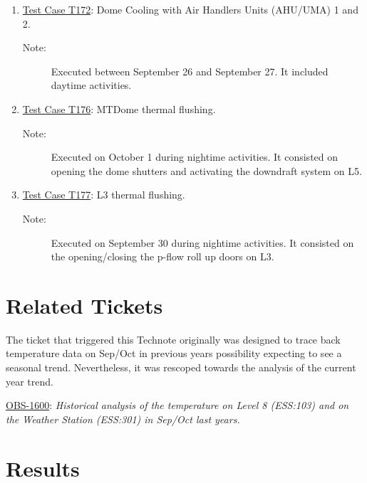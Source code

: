 \documentclass[SE,lsstdraft,authoryear,toc]{lsstdoc}
\begin{document}
\begin{enumerate}
  \item \href{https://rubinobs.atlassian.net/projects/BLOCK?selectedItem=com.atlassian.plugins.atlassian-connect-plugin:com.kanoah.test-manager__main-project-page#!/v2/testCase/BLOCK-T172}{Test Case T172}: Dome Cooling with Air Handlers Units (AHU/UMA) 1 and 2.
  \begin{description}
    \item[Note:] Executed between September 26 and September 27. It included daytime activities.
  \end{description}
  \item \href{https://rubinobs.atlassian.net/projects/BLOCK?selectedItem=com.atlassian.plugins.atlassian-connect-plugin:com.kanoah.test-manager__main-project-page#!/v2/testCase/BLOCK-T176}{Test Case T176}: MTDome thermal flushing.
  \begin{description}
    \item[Note:] Executed on October 1 during nightime activities. It consisted on opening the dome shutters and activating the downdraft system on L5.
  \end{description}
  \item \href{https://rubinobs.atlassian.net/projects/BLOCK?selectedItem=com.atlassian.plugins.atlassian-connect-plugin:com.kanoah.test-manager__main-project-page#!/v2/testCase/BLOCK-T177}{Test Case T177}: L3 thermal flushing.
  \begin{description}
    \item[Note:] Executed on September 30 during nightime activities. It consisted on the opening/closing the p-flow roll up doors on L3.
  \end{description}
\end{enumerate}

\section{Related Tickets}
The ticket that triggered this Technote originally was designed to trace back temperature data on Sep/Oct in previous years possibility expecting to see a seasonal trend.  Nevertheless, it was rescoped towards the analysis of the current year trend.

\href{https://rubinobs.atlassian.net/browse/SITCOM-1600}{OBS-1600}: \textit{Historical analysis of the temperature on Level 8 (ESS:103) and on the Weather Station (ESS:301) in Sep/Oct last years.}


\section{Results}
\end{document}
